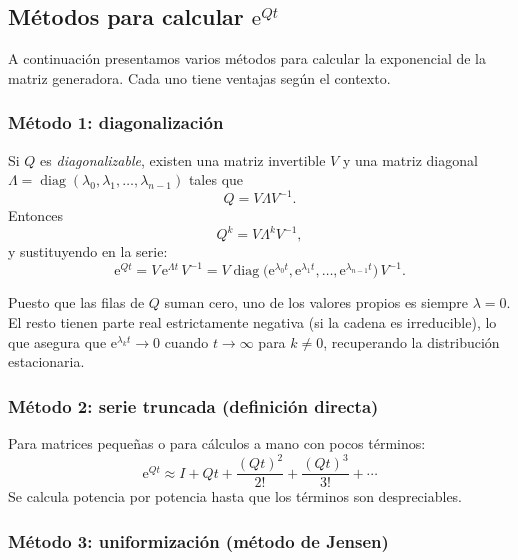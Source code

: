 \documentclass[11pt,a4paper]{article}
\theoremstyle{definition}
\theoremstyle{remark}
\newcommand{\e}{\mathrm{e}}
\DeclareMathOperator{\diag}{diag}
\begin{document}
\subsection{Métodos para calcular \texorpdfstring{$\e^{Qt}$}{exp(Qt)}}
\label{sec:metodos}

A continuación presentamos varios métodos para calcular la exponencial
de la matriz generadora.  Cada uno tiene ventajas según el contexto.

\subsubsection{Método 1: diagonalización}

Si $Q$ es \emph{diagonalizable}, existen una matriz invertible $V$ y una
matriz diagonal $\Lambda = \diag(\lambda_0,\lambda_1,\dots,\lambda_{n-1})$
tales que
\[
  Q = V \Lambda V^{-1}.
\]
Entonces
\[
  Q^k = V\Lambda^k V^{-1},
\]
y sustituyendo en la serie:
\[
  \e^{Qt} = V\,\e^{\Lambda t}\,V^{-1}
  = V \diag\!\bigl(\e^{\lambda_0 t},\e^{\lambda_1 t},\dots,
    \e^{\lambda_{n-1}t}\bigr)\,V^{-1}.
\]

\begin{cajanota}
Puesto que las filas de $Q$ suman cero, uno de los valores propios es
siempre $\lambda = 0$.  El resto tienen parte real estrictamente negativa
(si la cadena es irreducible), lo que asegura que
$\e^{\lambda_k t}\to 0$ cuando $t\to\infty$ para $k\ne 0$, recuperando
la distribución estacionaria.
\end{cajanota}

\subsubsection{Método 2: serie truncada (definición directa)}

Para matrices pequeñas o para cálculos a mano con pocos términos:
\[
  \e^{Qt} \approx I + Qt + \frac{(Qt)^2}{2!} + \frac{(Qt)^3}{3!} + \cdots
\]
Se calcula potencia por potencia hasta que los términos son despreciables.

\subsubsection{Método 3: uniformización (método de Jensen)}
\label{sec:uniformizacion}
\end{document}
